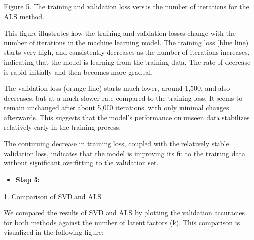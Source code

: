 \documentclass[letterpaper]{article}
\begin{document}
{\centering
Figure 5. The training and validation loss versus the number of iterations for the ALS method.
\par}


\bigskip

This figure illustrates how the training and validation losses change with the number of iterations in the machine
learning model. The training loss (blue line) starts very high, and consistently decreases as the number of iterations
increases, indicating that the model is learning from the training data. The rate of decrease is rapid initially and
then becomes more gradual.

The validation loss (orange line) starts much lower, around 1,500, and also decreases, but at a much slower rate
compared to the training loss. It seems to remain unchanged after about 5,000 iterations, with only minimal changes
afterwards. This suggests that the model's performance on unseen data stabilizes relatively early in the training
process.

The continuing decrease in training loss, coupled with the relatively stable validation loss, indicates that the model
is improving its fit to the training data without significant overfitting to the validation set.


\bigskip

\begin{itemize}[resume*=listWWNumii]
\item \textbf{Step 3:}
\end{itemize}

\bigskip

1. Comparison of SVD and ALS

We compared the results of SVD and ALS by plotting the validation accuracies for both methods against the number of
latent factors (k). This comparison is visualized in the following figure:


\end{document}

